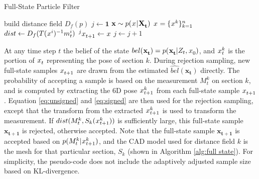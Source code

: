 \documentclass[letterpaper, 10 pt, conference]{ieeeconf}
\newcommand{\measurement}{m}
\begin{document}
\begin{algorithm}[t]
  \caption{Full-State Particle Filter}\label{alg:full state}
  \begin{algorithmic}[1]
    \Require{observation $\measurement^i_t$}
    \State build distance field $D_f(p)$
    \State $j \gets \mathbf{1}$
    \State $\mathbf{x}\sim p(\particle|\mathbf{\particles[t]})$ \Comment $\particle = \{\particle[][][k]\}^n_{k=1}$
    \State $dist \gets D_f(T(\particle[][][i])^{-1}\measurement^i_t)$
    \State $\particle[t+1][j]\gets \particle$
    \State $j \gets j+1$
    \EndIf
    \EndWhile
  \end{algorithmic}
\end{algorithm}

At any time step $t$ the belief of the state $bel(\mathbf{\particle[t]}) = p(\mathbf{\particle[t]}| Z_t, \particle[0])$, and $\particle[t][][k]$ is the portion of $\particle[t]$ representing the pose of section $k$. 
During rejection sampling, new full-state samples $\particle[t+1]$ are drawn from the estimated $\hat{bel}(\mathbf{x_t})$ directly. 
The probability of accepting a sample is based on the measurement $M^k_t$ on section $k$, and is computed by extracting the 6D pose $\particle[t+1][][k]$ from each full-state sample $\particle[t+1]$. Equation \ref{eq:unsigned} and \ref{eq:signed} are then used for the rejection sampling, except that the transform from the extracted $\particle[t+1][][k]$ is used to transform the measurement. 
If $dist(M^k_t,S_k(\particle[t+1][][k]))$ is sufficiently large, this full-state sample $\mathbf{x_{t+1}}$ is rejected, otherwise accepted. 
Note that the full-state sample $\mathbf{x_{t+1}}$ is accepted based on $p(M^k_t|\particle[t+1][][k])$, and the CAD model used for distance field $k$ is the mesh for that particular section, $S_k$ (shown in Algorithm \ref{alg:full state}). For simplicity, the pseudo-code does not include the adaptively adjusted sample size based on KL-divergence\cite{Saund2017}\cite{Fox2003}. 

\end{document}
